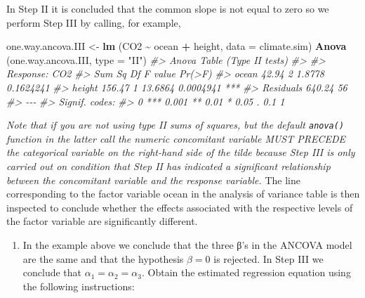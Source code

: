 \documentclass[
]{book}
\newenvironment{Shaded}{\begin{snugshade}}{\end{snugshade}}
\newcommand{\AttributeTok}[1]{\textcolor[rgb]{0.13,0.29,0.53}{#1}}
\newcommand{\CommentTok}[1]{\textcolor[rgb]{0.56,0.35,0.01}{\textit{#1}}}
\newcommand{\FunctionTok}[1]{\textcolor[rgb]{0.13,0.29,0.53}{\textbf{#1}}}
\newcommand{\NormalTok}[1]{#1}
\newcommand{\OtherTok}[1]{\textcolor[rgb]{0.56,0.35,0.01}{#1}}
\newcommand{\SpecialCharTok}[1]{\textcolor[rgb]{0.81,0.36,0.00}{\textbf{#1}}}
\newcommand{\StringTok}[1]{\textcolor[rgb]{0.31,0.60,0.02}{#1}}
\providecommand{\tightlist}{%
  \setlength{\itemsep}{0pt}\setlength{\parskip}{0pt}}
\begin{document}
In Step II it is concluded that the common slope is not equal to zero so we perform Step III by calling, for example,

\begin{Shaded}
\begin{Highlighting}[]
\NormalTok{one.way.ancova.III }\OtherTok{\textless{}{-}} \FunctionTok{lm}\NormalTok{ (CO2 }\SpecialCharTok{\textasciitilde{}}\NormalTok{ ocean }\SpecialCharTok{+}\NormalTok{ height, }\AttributeTok{data =}\NormalTok{ climate.sim)}
\FunctionTok{Anova}\NormalTok{ (one.way.ancova.III, }\AttributeTok{type =} \StringTok{"II"}\NormalTok{)}
\CommentTok{\#\textgreater{} Anova Table (Type II tests)}
\CommentTok{\#\textgreater{} }
\CommentTok{\#\textgreater{} Response: CO2}
\CommentTok{\#\textgreater{}           Sum Sq Df F value    Pr(\textgreater{}F)    }
\CommentTok{\#\textgreater{} ocean      42.94  2  1.8778 0.1624241    }
\CommentTok{\#\textgreater{} height    156.47  1 13.6864 0.0004941 ***}
\CommentTok{\#\textgreater{} Residuals 640.24 56                      }
\CommentTok{\#\textgreater{} {-}{-}{-}}
\CommentTok{\#\textgreater{} Signif. codes:  }
\CommentTok{\#\textgreater{} 0 \textquotesingle{}***\textquotesingle{} 0.001 \textquotesingle{}**\textquotesingle{} 0.01 \textquotesingle{}*\textquotesingle{} 0.05 \textquotesingle{}.\textquotesingle{} 0.1 \textquotesingle{} \textquotesingle{} 1}
\end{Highlighting}
\end{Shaded}

\emph{Note that if you are not using type II sums of squares, but the default \texttt{anova()} function in the latter call the numeric concomitant variable MUST PRECEDE the categorical variable on the right-hand side of the tilde because Step III is only carried out on condition that Step II has indicated a significant relationship between the concomitant variable and the response variable.} The line corresponding to the factor variable ocean in the analysis of variance table is then inspected to conclude whether the effects associated with the respective levels of the factor variable are significantly different.

\begin{enumerate}
\def\labelenumi{(\roman{enumi})}
\tightlist
\item
  In the example above we conclude that the three β's in the ANCOVA model are the same and that the hypothesis \(\beta = 0\) is rejected. In Step III we conclude that \(\alpha_1 = \alpha_2 = \alpha_3\). Obtain the estimated regression equation using the following instructions:
\end{enumerate}
\end{document}
